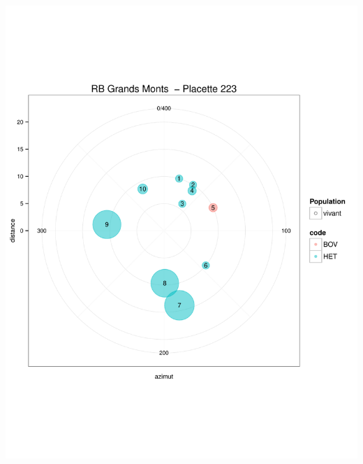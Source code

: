 \documentclass[a4paper]{book}\usepackage[]{graphicx}\usepackage[]{color}
\makeatletter
\def\maxwidth{ %
  \ifdim\Gin@nat@width>\linewidth
    \linewidth
  \else
    \Gin@nat@width
  \fi
}
\newenvironment{knitrout}{}{} %
\makeatother
\begin{document}
\begin{knitrout}
{\centering \includegraphics[width=\maxwidth]{Figures/PlanArbres-23} 

}





\end{knitrout}
\end{document}
